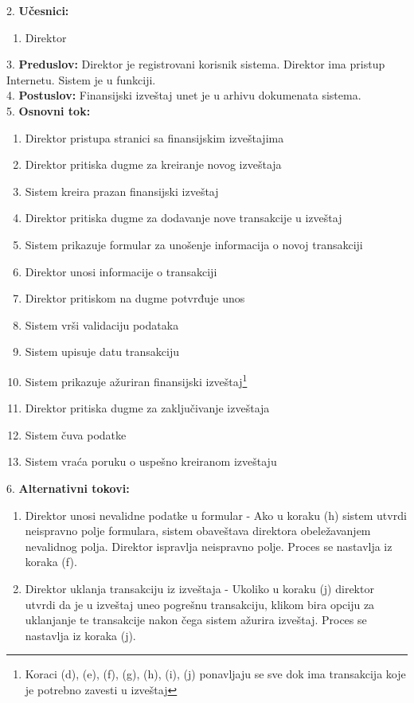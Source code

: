 \documentclass{article}
\begin{document}
2. \textbf{Učesnici:}
\begin{enumerate} [label=(\alph*)]
\item Direktor
\end{enumerate} 

3. \textbf{Preduslov:} Direktor je registrovani korisnik sistema. Direktor ima pristup Internetu. Sistem je u funkciji. \\

4. \textbf{Postuslov:} Finansijski izveštaj unet je u arhivu dokumenata sistema. \\

5. \textbf{Osnovni tok:} 
\begin{enumerate} [label=(\alph*)]
\item Direktor pristupa stranici sa finansijskim izveštajima
\item Direktor pritiska dugme za kreiranje novog izveštaja
\item Sistem kreira prazan finansijski izveštaj
\item Direktor pritiska dugme za dodavanje nove transakcije u izveštaj
\item Sistem prikazuje formular za unošenje informacija o novoj transakciji
\item Direktor unosi informacije o transakciji
\item Direktor pritiskom na dugme potvrđuje unos
\item Sistem vrši validaciju podataka
\item Sistem upisuje datu transakciju
\item Sistem prikazuje ažuriran finansijski izveštaj\footnote{Koraci (d), (e), (f), (g), (h), (i), (j) ponavljaju se sve dok ima transakcija koje je potrebno zavesti u izveštaj}
\item Direktor pritiska dugme za zaključivanje izveštaja
\item Sistem čuva podatke
\item Sistem vraća poruku o uspešno kreiranom izveštaju

\end{enumerate}

6. \textbf{Alternativni tokovi:} 
\begin{enumerate} [label=(\roman*)]
\item Direktor unosi nevalidne podatke u formular - Ako u koraku (h) sistem utvrdi neispravno polje formulara, sistem obaveštava direktora obeležavanjem nevalidnog polja. Direktor ispravlja neispravno polje. Proces se nastavlja iz koraka (f).
\item Direktor uklanja transakciju iz izveštaja - Ukoliko u koraku (j) direktor utvrdi da je u izveštaj uneo pogrešnu transakciju, klikom bira opciju za uklanjanje te transakcije nakon čega sistem ažurira izveštaj. Proces se nastavlja iz koraka (j).  
\end{enumerate}
\end{document}
